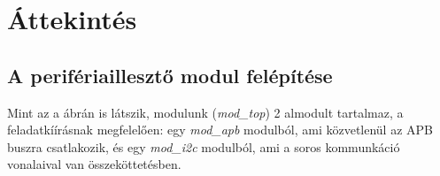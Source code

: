 \chapter{Áttekintés}
\label{sec:overview}
\section{A perifériaillesztő modul felépítése}

Mint az a  ábrán is látszik, modulunk (\emph{mod\_top}) 2 almodult tartalmaz, a feladatkíírásnak megfelelően: egy \emph{mod\_apb} modulból, ami közvetlenül az APB buszra csatlakozik, és egy \emph{mod\_i2c} modulból, ami a soros kommunkáció vonalaival van összeköttetésben.

